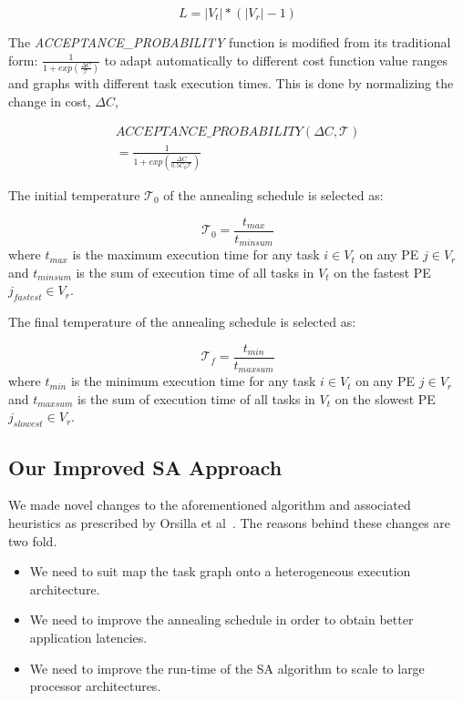 \begin{equation}
L = |V_t|*(|V_r| - 1)
\end{equation}

The \textit{ACCEPTANCE\_PROBABILITY} function is modified from its
traditional form: $\frac{1}{1+exp(\frac{\Delta C}{\mathcal{T}})}$ to
adapt automatically to different cost function value ranges and graphs
with different task execution times. This is done by normalizing the
change in cost, $\Delta C$,

\begin{equation}
  \begin{array}{c}
    ACCEPTANCE\_PROBABILITY(\Delta C, \mathcal{T}) \\ 
    = \frac{1}{1+exp(\frac{\Delta C}{0.5C_0\mathcal{T}})}
  \end{array}
\end{equation}

The initial temperature $\mathcal{T}_0$ of the annealing schedule is
selected as:

\begin{equation}
\mathcal{T}_0 = \frac{t_{max}}{t_{minsum}}
\end{equation}
\noindent
where $t_{max}$ is the maximum execution time for any task $i \in V_t$
on any PE $j \in V_r$ and $t_{minsum}$ is the sum of execution time of
all tasks in $V_t$ on the fastest PE $j_{fastest} \in V_r$.

The final temperature of the annealing schedule is selected as:

\begin{equation}
\mathcal{T}_f = \frac{t_{min}}{t_{maxsum}}
\end{equation}
\noindent
where $t_{min}$ is the minimum execution time for any task $i \in V_t$
on any PE $j \in V_r$ and $t_{maxsum}$ is the sum of execution time of
all tasks in $V_t$ on the slowest PE $j_{slowest} \in
V_r$. %

\subsection{Our Improved SA Approach}
\label{sec:our-improved-sa}

We made novel changes to the aforementioned algorithm and associated
heuristics as prescribed by Orsilla et al~\cite{hors06}. The reasons
behind these changes are two fold.

\begin{itemize}
\item We need to suit map the task graph onto a heterogeneous execution
  architecture.

\item We need to improve the annealing schedule in order to obtain
  better application latencies.

\item We need to improve the run-time of the SA algorithm to scale to
  large processor architectures.
\end{itemize}

